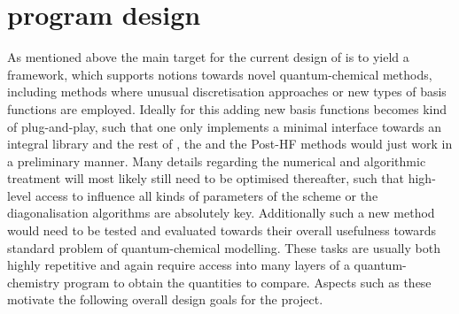 \section{\molsturm program design}
\label{sec:MolsturmDesign}

As mentioned above the main target for the current design of \molsturm
is to yield a framework,
which supports notions towards novel quantum-chemical methods,
including methods where unusual discretisation approaches
or new types of basis functions are employed.
Ideally for this adding
new basis functions becomes kind of plug-and-play,
such that one only implements a minimal interface
towards an integral library and the rest of \molsturm,
\ie the \SCF and the Post-HF methods would just work
in a preliminary manner.
Many details regarding the numerical and algorithmic treatment
will most likely still need to be optimised thereafter,
such that high-level access to influence
all kinds of parameters of the \SCF scheme or the
diagonalisation algorithms are absolutely key.
Additionally such a new method would need to be tested and evaluated
towards their overall usefulness towards standard problem
of quantum-chemical modelling.
These tasks are usually both highly repetitive and again
require access into many layers of a quantum-chemistry program
to obtain the quantities to compare.
Aspects such as these motivate
the following overall design goals for the \molsturm project.

